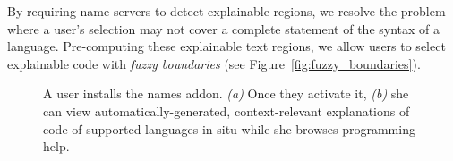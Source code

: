 By requiring \gls{name} servers to detect explainable regions, we resolve the problem where a user's selection may not cover a complete statement of the syntax of a language.
Pre-computing these explainable text regions, we allow users to select explainable code with \emph{fuzzy boundaries} (see Figure~\ref{fig:fuzzy_boundaries}).

\begin{figure}
    \centering
    \label{fig:browser_tutorons_markup}
    \caption{A user installs the \Glspl{name} addon.  \emph{(a)} Once they activate it, \emph{(b)} she can view automatically-generated, context-relevant explanations of code of supported languages in-situ while she browses programming help.}
\end{figure}
\fi

